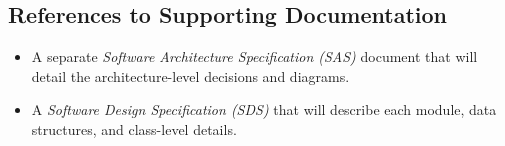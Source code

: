 \documentclass[12pt]{article}
\begin{document}
\subsection{References to Supporting Documentation}
\begin{itemize}
  \item A separate \emph{Software Architecture Specification (SAS)} document that will detail the architecture-level decisions and diagrams.
  \item A \emph{Software Design Specification (SDS)} that will describe each module, data structures, and class-level details.
\end{itemize}
\end{document}
